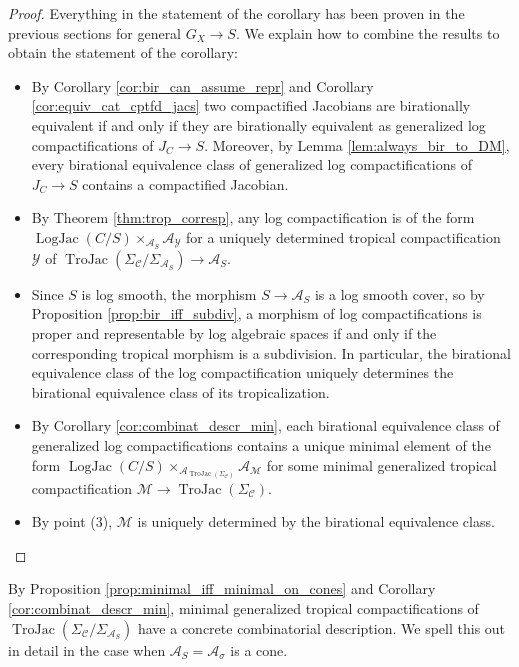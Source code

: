 \documentclass[11pt]{amsart}
\theoremstyle{definition}
\theoremstyle{remark}
\DeclareMathOperator{\LogJac}{LogJac}
\DeclareMathOperator{\TroJac}{TroJac}
\begin{document}
\begin{proof}
	Everything in the statement of the corollary has been proven in the previous sections for
	general $G_X\to S$. We explain how to combine the results to obtain the statement of the corollary:
\begin{itemize}
	\item By Corollary \ref{cor:bir_can_assume_repr} and Corollary \ref{cor:equiv_cat_cptfd_jacs}
		two compactified Jacobians are birationally equivalent if and only if they are birationally equivalent as
		generalized log compactifications of $J_C\to S$. Moreover, by Lemma \ref{lem:always_bir_to_DM}, every birational equivalence
		class of generalized log compactifications of $J_C\to S$ contains a compactified Jacobian.
	\item By Theorem \ref{thm:trop_corresp}, any log compactification is of the form $\LogJac(C/S)\times_{\mathcal{A}_S}\mathcal{A}_{\mathcal{Y}}$
		for a uniquely determined tropical compactification $\mathcal{Y}$ of $\TroJac(\Sigma_{\mathcal{C}}/\Sigma_{\mathcal{A}_{S}})\to \mathcal{A}_S$.
	\item Since $S$ is log smooth, the morphism $S\to \mathcal{A}_S$ is a log smooth cover, so by Proposition \ref{prop:bir_iff_subdiv}, a morphism of log compactifications is proper and representable by log algebraic spaces if and only if the corresponding tropical morphism is a subdivision. In particular, the birational equivalence class of the log compactification uniquely determines the birational equivalence class of its tropicalization.
	\item By Corollary \ref{cor:combinat_descr_min}, each birational equivalence class of generalized log compactifications contains a unique minimal element of the form $\LogJac(C/S)\times_{\mathcal{A}_{\TroJac(\Sigma_{\mathcal{C}})}}\mathcal{A}_{\mathcal{M}}$ for some minimal generalized tropical compactification $\mathcal{M}\to \TroJac(\Sigma_{\mathcal{C}})$.
	\item By point (3), $\mathcal{M}$ is uniquely determined by the birational equivalence class.
\end{itemize}
\end{proof}

By Proposition \ref{prop:minimal_iff_minimal_on_cones} and Corollary \ref{cor:combinat_descr_min}, minimal generalized tropical compactifications
of $\TroJac(\Sigma_{\mathcal{C}}/\Sigma_{\mathcal{A}_{S}})$ have a concrete combinatorial description. We spell this out in detail
in the case when $\mathcal{A}_S=\mathcal{A}_{\sigma}$ is a cone.
\end{document}
